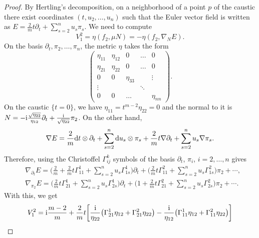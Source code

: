 \documentclass[10pt,a4paper]{amsart}
\numberwithin{equation}{section}
\begin{document}
\begin{proof}
 By Hertling's decomposition, on a neighborhood of a point $p$ of the caustic there exist coordinates $(t,u_{2},\dots,u_{n})$ such that the Euler vector field is written as $E=\tfrac{2}{m}t\partial_{t}+\sum_{s=2}^{n}u_{s}\pi_{s}$.
 We need to compute
 \begin{equation*}
 V_{1}^{2}=\eta(f_{2},\mu N)=-\eta(f_{2},\nabla_{N}E).
 \end{equation*}
 On the basis $\partial_{t},\pi_{2},\dots,\pi_{n}$, the metric $\eta$ takes the form
\begin{equation*}
 \begin{pmatrix}
 \eta_{11}&\eta_{12}&0&\dots&0\\
 \eta_{21}&\eta_{22}&0&\dots&0\\
 0&0&\eta_{33}&\,&\vdots\\
 \vdots& \,&\,&\ddots&\,\\
 0&0&\dots&\,&\eta_{nn}
 \end{pmatrix}.
\end{equation*}
On the caustic $\{ t=0 \}$, we have $\eta_{11}=t^{m-2}\eta_{22}=0$ and the normal to it is $N=-{\rm i}\frac{\sqrt{\eta_{22}}}{\eta_{12}}\partial_{t}+\frac{{\rm i}}{
\sqrt{\eta_{22}}}\pi_{2}$. On the other hand,
\begin{equation*}
 \nabla E=\frac{2}{m}{\rm d}t\otimes\partial_{t}+\sum_{s=2}^{n}{\rm d} u_{s}\otimes\pi_{s} +\frac{2}{m}t\nabla\partial_{t}+\sum_{s=2}^{n}u_{s}\nabla\pi_{s}.
\end{equation*}
Therefore, using the Christoffel $\Gamma_{ij}^{k}$ symbols of the basis $\partial_{t}$, $\pi_{i}$, $i=2,\dots,n$ gives
\begin{align*}
 &\nabla_{\partial_{t}}E=\Biggl( \frac{2}{m}+\frac{2}{m}t\Gamma_{11}^{1}+\sum_{s=2}^{n}u_{s}\Gamma_{1s}^{1}\Biggr)\partial_{t}+\Biggl( \frac{2}{m}t\Gamma_{11}^{2}+\sum_{s=2}^{n}u_{s}\Gamma_{1s}^{2}\Biggr)\pi_{2}+\cdots,\\
 &\nabla_{\pi_{2}}E=\Biggl(\frac{2}{m}t\Gamma_{21}^{1}+\sum_{s=2}^{n}u_{s}\Gamma_{2s}^{1}\Biggr)\partial_{t}+\Biggl( 1+\frac{2}{m}t\Gamma_{21}^{2}+\sum_{s=2}^{n}u_{s}\Gamma_{2s}^{2}\Biggr)\pi_{2}+\cdots.
\end{align*}
With this, we get
\begin{gather*}
 V^{2}_{1}= {\rm i}\frac{m-2}{m}+\frac{2}{m}t\bigg[ \frac{{\rm i}}{\eta_{22}}\bigl(\Gamma_{21}^{1}\eta_{12}+\Gamma_{21}^{2}\eta_{22} \bigr)-\frac{{\rm i}}{\eta_{12}}\bigl(\Gamma_{11}^{1}\eta_{12}+\Gamma_{11}^{2}\eta_{22} \bigr)\bigg] \\

\end{gather*}
\end{proof}
\end{document}
